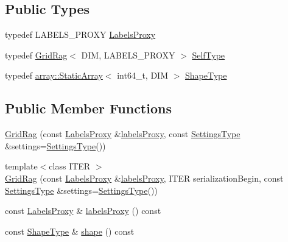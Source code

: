 \subsection*{Public Types}
\begin{DoxyCompactItemize}
\item 
typedef L\+A\+B\+E\+L\+S\+\_\+\+P\+R\+O\+XY \hyperlink{classnifty_1_1graph_1_1GridRag_ad3146f72301da4f45b51e3b692776cf1}{Labels\+Proxy}
\item 
typedef \hyperlink{classnifty_1_1graph_1_1GridRag}{Grid\+Rag}$<$ D\+IM, L\+A\+B\+E\+L\+S\+\_\+\+P\+R\+O\+XY $>$ \hyperlink{classnifty_1_1graph_1_1GridRag_aa5e47cff6ae70d13254abc3382b3b166}{Self\+Type}
\item 
typedef \hyperlink{namespacenifty_1_1array_a683f151f19c851754e0c6d55ed16a0c2}{array\+::\+Static\+Array}$<$ int64\+\_\+t, D\+IM $>$ \hyperlink{classnifty_1_1graph_1_1GridRag_a3693e007e1419dec9751cca751a1061d}{Shape\+Type}
\end{DoxyCompactItemize}
\subsection*{Public Member Functions}
\begin{DoxyCompactItemize}
\item 
\hyperlink{classnifty_1_1graph_1_1GridRag_a68da171354688c46cbb33d953e7ba267}{Grid\+Rag} (const \hyperlink{classnifty_1_1graph_1_1GridRag_ad3146f72301da4f45b51e3b692776cf1}{Labels\+Proxy} \&\hyperlink{classnifty_1_1graph_1_1GridRag_a8589e44e41c12e7956d7d25a644c238e}{labels\+Proxy}, const \hyperlink{structnifty_1_1graph_1_1GridRag_1_1SettingsType}{Settings\+Type} \&settings=\hyperlink{structnifty_1_1graph_1_1GridRag_1_1SettingsType}{Settings\+Type}())
\item 
{\footnotesize template$<$class I\+T\+ER $>$ }\\\hyperlink{classnifty_1_1graph_1_1GridRag_adcc1771b68011ee041bdf83180f72e73}{Grid\+Rag} (const \hyperlink{classnifty_1_1graph_1_1GridRag_ad3146f72301da4f45b51e3b692776cf1}{Labels\+Proxy} \&\hyperlink{classnifty_1_1graph_1_1GridRag_a8589e44e41c12e7956d7d25a644c238e}{labels\+Proxy}, I\+T\+ER serialization\+Begin, const \hyperlink{structnifty_1_1graph_1_1GridRag_1_1SettingsType}{Settings\+Type} \&settings=\hyperlink{structnifty_1_1graph_1_1GridRag_1_1SettingsType}{Settings\+Type}())
\item 
const \hyperlink{classnifty_1_1graph_1_1GridRag_ad3146f72301da4f45b51e3b692776cf1}{Labels\+Proxy} \& \hyperlink{classnifty_1_1graph_1_1GridRag_a8589e44e41c12e7956d7d25a644c238e}{labels\+Proxy} () const
\item 
const \hyperlink{classnifty_1_1graph_1_1GridRag_a3693e007e1419dec9751cca751a1061d}{Shape\+Type} \& \hyperlink{classnifty_1_1graph_1_1GridRag_a63c46e4d01bf30e7366e5781a0f3de5f}{shape} () const
\end{DoxyCompactItemize}
